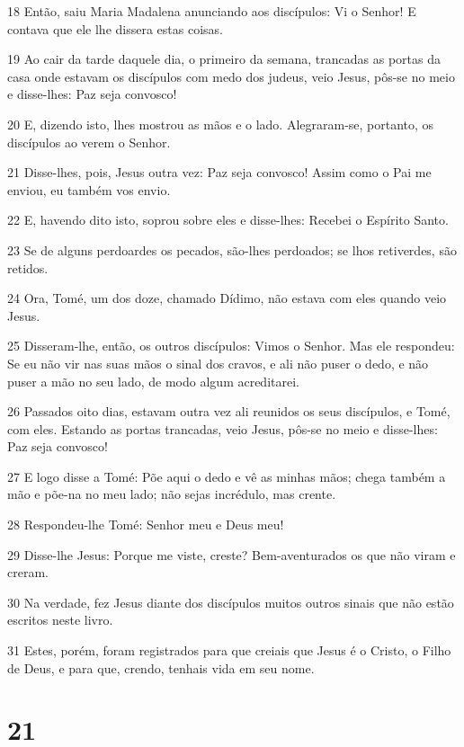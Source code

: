 \par 18 Então, saiu Maria Madalena anunciando aos discípulos: Vi o Senhor! E contava que ele lhe dissera estas coisas.
\par 19 Ao cair da tarde daquele dia, o primeiro da semana, trancadas as portas da casa onde estavam os discípulos com medo dos judeus, veio Jesus, pôs-se no meio e disse-lhes: Paz seja convosco!
\par 20 E, dizendo isto, lhes mostrou as mãos e o lado. Alegraram-se, portanto, os discípulos ao verem o Senhor.
\par 21 Disse-lhes, pois, Jesus outra vez: Paz seja convosco! Assim como o Pai me enviou, eu também vos envio.
\par 22 E, havendo dito isto, soprou sobre eles e disse-lhes: Recebei o Espírito Santo.
\par 23 Se de alguns perdoardes os pecados, são-lhes perdoados; se lhos retiverdes, são retidos.
\par 24 Ora, Tomé, um dos doze, chamado Dídimo, não estava com eles quando veio Jesus.
\par 25 Disseram-lhe, então, os outros discípulos: Vimos o Senhor. Mas ele respondeu: Se eu não vir nas suas mãos o sinal dos cravos, e ali não puser o dedo, e não puser a mão no seu lado, de modo algum acreditarei.
\par 26 Passados oito dias, estavam outra vez ali reunidos os seus discípulos, e Tomé, com eles. Estando as portas trancadas, veio Jesus, pôs-se no meio e disse-lhes: Paz seja convosco!
\par 27 E logo disse a Tomé: Põe aqui o dedo e vê as minhas mãos; chega também a mão e põe-na no meu lado; não sejas incrédulo, mas crente.
\par 28 Respondeu-lhe Tomé: Senhor meu e Deus meu!
\par 29 Disse-lhe Jesus: Porque me viste, creste? Bem-aventurados os que não viram e creram.
\par 30 Na verdade, fez Jesus diante dos discípulos muitos outros sinais que não estão escritos neste livro.
\par 31 Estes, porém, foram registrados para que creiais que Jesus é o Cristo, o Filho de Deus, e para que, crendo, tenhais vida em seu nome.

\chapter{21}

